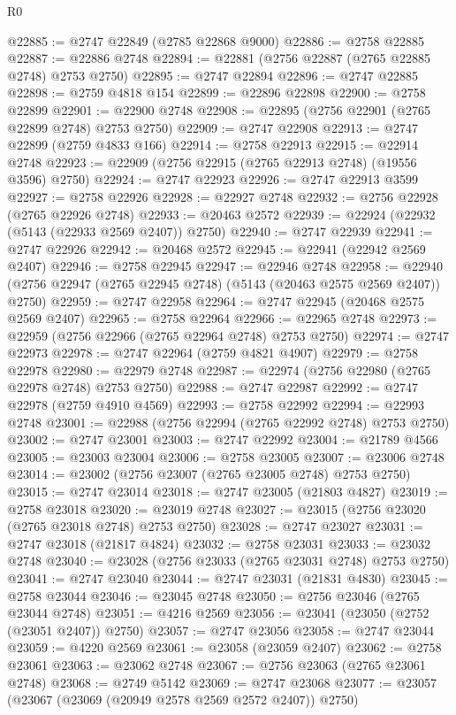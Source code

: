 \begin{lexlean}{R0}
\begin{coremodule}
@22885 := @2747 @22849 (@2785 @22868 @9000)
@22886 := @2758 @22885
@22887 := @22886 @2748
@22894 := @22881 (@2756 @22887 (@2765 @22885 @2748) @2753 @2750)
@22895 := @2747 @22894
@22896 := @2747 @22885
@22898 := @2759 @4818 @154
@22899 := @22896 @22898
@22900 := @2758 @22899
@22901 := @22900 @2748
@22908 := @22895 (@2756 @22901 (@2765 @22899 @2748) @2753 @2750)
@22909 := @2747 @22908
@22913 := @2747 @22899 (@2759 @4833 @166)
@22914 := @2758 @22913
@22915 := @22914 @2748
@22923 := @22909 (@2756 @22915 (@2765 @22913 @2748) (@19556 @3596) @2750)
@22924 := @2747 @22923
@22926 := @2747 @22913 @3599
@22927 := @2758 @22926
@22928 := @22927 @2748
@22932 := @2756 @22928 (@2765 @22926 @2748)
@22933 := @20463 @2572
@22939 := @22924 (@22932 (@5143 (@22933 @2569 @2407)) @2750)
@22940 := @2747 @22939
@22941 := @2747 @22926
@22942 := @20468 @2572
@22945 := @22941 (@22942 @2569 @2407)
@22946 := @2758 @22945
@22947 := @22946 @2748
@22958 := @22940 (@2756 @22947 (@2765 @22945 @2748) (@5143 (@20463 @2575 @2569 @2407)) @2750)
@22959 := @2747 @22958
@22964 := @2747 @22945 (@20468 @2575 @2569 @2407)
@22965 := @2758 @22964
@22966 := @22965 @2748
@22973 := @22959 (@2756 @22966 (@2765 @22964 @2748) @2753 @2750)
@22974 := @2747 @22973
@22978 := @2747 @22964 (@2759 @4821 @4907)
@22979 := @2758 @22978
@22980 := @22979 @2748
@22987 := @22974 (@2756 @22980 (@2765 @22978 @2748) @2753 @2750)
@22988 := @2747 @22987
@22992 := @2747 @22978 (@2759 @4910 @4569)
@22993 := @2758 @22992
@22994 := @22993 @2748
@23001 := @22988 (@2756 @22994 (@2765 @22992 @2748) @2753 @2750)
@23002 := @2747 @23001
@23003 := @2747 @22992
@23004 := @21789 @4566
@23005 := @23003 @23004
@23006 := @2758 @23005
@23007 := @23006 @2748
@23014 := @23002 (@2756 @23007 (@2765 @23005 @2748) @2753 @2750)
@23015 := @2747 @23014
@23018 := @2747 @23005 (@21803 @4827)
@23019 := @2758 @23018
@23020 := @23019 @2748
@23027 := @23015 (@2756 @23020 (@2765 @23018 @2748) @2753 @2750)
@23028 := @2747 @23027
@23031 := @2747 @23018 (@21817 @4824)
@23032 := @2758 @23031
@23033 := @23032 @2748
@23040 := @23028 (@2756 @23033 (@2765 @23031 @2748) @2753 @2750)
@23041 := @2747 @23040
@23044 := @2747 @23031 (@21831 @4830)
@23045 := @2758 @23044
@23046 := @23045 @2748
@23050 := @2756 @23046 (@2765 @23044 @2748)
@23051 := @4216 @2569
@23056 := @23041 (@23050 (@2752 (@23051 @2407)) @2750)
@23057 := @2747 @23056
@23058 := @2747 @23044
@23059 := @4220 @2569
@23061 := @23058 (@23059 @2407)
@23062 := @2758 @23061
@23063 := @23062 @2748
@23067 := @2756 @23063 (@2765 @23061 @2748)
@23068 := @2749 @5142
@23069 := @2747 @23068
@23077 := @23057 (@23067 (@23069 (@20949 @2578 @2569 @2572 @2407)) @2750)

\end{coremodule}
\end{lexlean}
